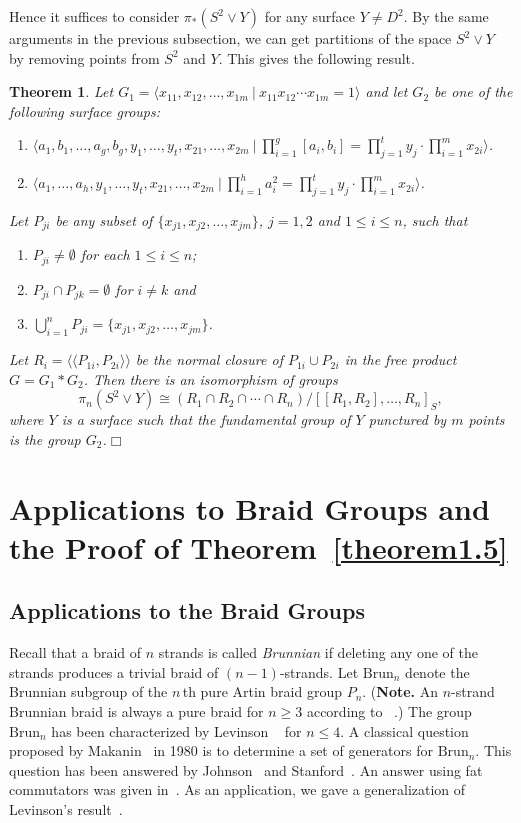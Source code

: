 \documentclass[10pt]{amsart}
\newtheorem{thm}{Theorem}[section]
\let\la=\langle
\let\ra=\rangle
\numberwithin{equation}{section}
\begin{document}
Hence it suffices to consider $\pi_*(S^2\vee Y)$ for any surface $Y\not=D^2$. By the same arguments in the previous subsection, we can get partitions of the space $S^2\vee Y$ by removing points from $S^2$ and $Y$. This gives the following result.

\begin{thm}
Let $G_1=\la x_{11},x_{12},\ldots,x_{1m} \ | \ x_{11}x_{12}\cdots x_{1m}=1\ra$ and let $G_2$ be one of the following surface groups:
\begin{enumerate}
\item[(a)] $\la a_1,b_1,\ldots,a_g,b_g, y_1,\ldots,y_t, x_{21},\ldots,x_{2m} \ | \ \prod\limits_{i=1}^g[a_i,b_i]=\prod\limits_{j=1}^ty_j\cdot \prod\limits_{i=1}^m x_{2i}\ra$.
\item[(b)]  $\la a_1,\ldots,a_h, y_1,\ldots,y_t, x_{21},\ldots,x_{2m} \ | \ \prod\limits_{i=1}^h a_i^2=\prod\limits_{j=1}^ty_j\cdot \prod\limits_{i=1}^m x_{2i}\ra$.
\end{enumerate}
Let $P_{ji}$ be any subset of $\{x_{j1},x_{j2},\ldots,x_{jm}\}$, $j=1,2$ and $1\leq i\leq n$, such that
\begin{enumerate}
\item[(i)] $P_{ji}\not=\emptyset$ for each $1\leq i\leq n$;
\item[(ii)] $P_{ji}\cap P_{jk}=\emptyset$ for $i\not=k$ and
\item[(iii)] $\bigcup_{i=1}^n P_{ji}=\{x_{j1},x_{j2},\ldots,x_{jm}\}$.
\end{enumerate}
Let $R_i=\la\la P_{1i},P_{2i}\ra \ra$ be the normal closure of $P_{1i}\cup P_{2i}$ in the free product $G=G_1\ast G_2$. Then there is an isomorphism of groups
$$
\pi_n(S^2\vee Y)\cong (R_1\cap R_2\cap\cdots\cap R_n)/[[R_1,R_2],\ldots,R_n]_S,
$$
where $Y$ is a surface such that the fundamental group of $Y$ punctured by $m$ points is the group $G_2$.\hfill $\Box$
\end{thm}

\section{Applications to Braid Groups and the Proof of Theorem~\ref{theorem1.5}}\label{section5}

\subsection{Applications to the Braid Groups}
Recall that a braid of $n$ strands is called \textit{Brunnian} if deleting any one of the strands produces a trivial braid of $(n-1)$-strands. Let ${\mathrm{Brun}}_n$ denote the Brunnian subgroup of the $n\,$th pure Artin braid group $P_n$. (\textbf{Note.} An $n$-strand Brunnian braid is always a pure braid for $n\geq3$ according to ~\cite[Proposition 4.2.2]{BCWW}.) The group ${\mathrm{Brun}}_n$ has been characterized by Levinson ~\cite{Levinson1,Levinson2} for $n\leq4$. A classical question proposed by Makanin~\cite{Makanin} in 1980 is to determine a set of generators for ${\mathrm{Brun}}_n$. This question has been answered by Johnson~\cite{Johnson} and Stanford~\cite{Stanford}. An answer using fat commutators was given in~\cite[Theorem 8.6.1]{BCWW}. As an application, we gave a generalization of Levinson's result~\cite[Theorem 2]{Levinson2}.
\end{document}
